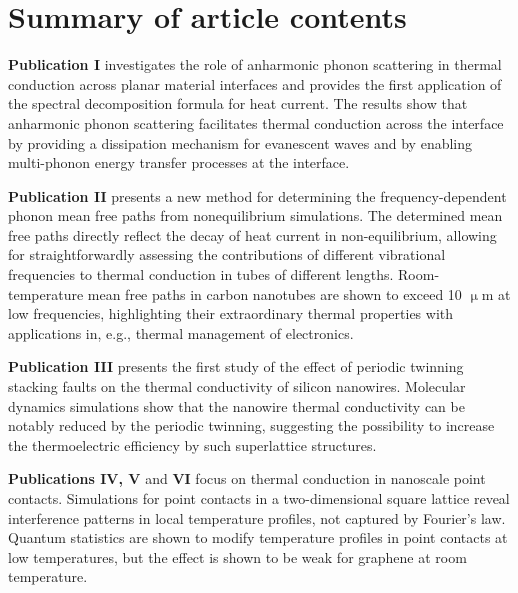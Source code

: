 \documentclass[dissertation,draft*]{aaltoseries}
\begin{document}
% 

\author{Kimmo S\"a\"askilahti}

\tableofcontents

\listofpublications

\chapter*{Summary of article contents}

\textbf{Publication I} investigates the role of anharmonic phonon scattering in thermal conduction across planar material interfaces and provides the first application of the spectral decomposition formula for heat current. The results show that anharmonic phonon scattering facilitates thermal conduction across the interface by providing a dissipation mechanism for evanescent waves and by enabling multi-phonon energy transfer processes at the interface.

\vspace{1cm}
\noindent
\textbf{Publication II} presents a new method for determining the frequency-dependent phonon mean free paths from nonequilibrium simulations. The determined mean free paths directly reflect the decay of heat current in non-equilibrium, allowing for straightforwardly assessing the contributions of different vibrational frequencies to thermal conduction in tubes of different lengths. Room-temperature mean free paths in carbon nanotubes are shown to exceed 10 $\upmu$m at low frequencies, highlighting their extraordinary thermal properties with applications in, e.g., thermal management of electronics. 

\vspace{1cm}
\noindent
\textbf{Publication III} presents the first study of the effect of periodic twinning stacking faults on the thermal conductivity of silicon nanowires. Molecular dynamics simulations show that the nanowire thermal conductivity can be notably reduced by the periodic twinning, suggesting the possibility to increase the thermoelectric efficiency by such superlattice structures.

\vspace{1cm}
\noindent
\textbf{Publications IV, V} and \textbf{VI} focus on thermal conduction in nanoscale point contacts. Simulations for point contacts in a two-dimensional square lattice reveal interference patterns in local temperature profiles, not captured by Fourier's law. Quantum statistics are shown to modify temperature profiles in point contacts at low temperatures, but the effect is shown to be weak for graphene at room temperature.
\end{document}
